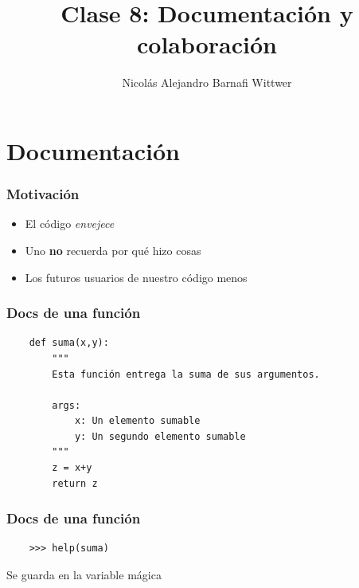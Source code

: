 \documentclass[14pt,aspectratio=169,xcolor=dvipsnames]{beamer}
\title[short title]{Clase 8: Documentación y colaboración}
\subtitle{}
\author[NA Barnafi] {Nicolás Alejandro Barnafi Wittwer}
\institute[UC|CMM] 
{
    Pontificia Universidad Católica de Chile \\
    Centro de Modelamiento Matemático
}
\date{}
\begin{document}
\begin{frame}
    \maketitle
\end{frame}
\section{Documentación}
\begin{frame}\frametitle{Motivación}
    \begin{itemize}
        \item El código \emph{envejece}
        \item Uno \textbf{no} recuerda por qué hizo cosas
        \item Los futuros usuarios de nuestro código \huge{menos}
    \end{itemize}
\end{frame}
\begin{frame}[fragile]\frametitle{Docs de una función}
    \begin{verbatim}
    def suma(x,y):
        """
        Esta función entrega la suma de sus argumentos. 
            
        args: 
            x: Un elemento sumable
            y: Un segundo elemento sumable
        """
        z = x+y
        return z
    \end{verbatim}
\end{frame}
\begin{frame}[fragile]\frametitle{Docs de una función}
    \begin{verbatim}
    >>> help(suma)
    \end{verbatim}

    \vspace{1cm}
    Se guarda en la variable mágica 

\end{frame}
\end{document}
